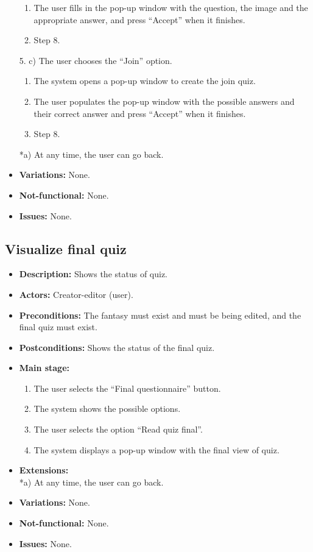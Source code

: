 \begin{itemize}
\begin{enumerate}
		\item The user fills in the pop-up window with the question, the image and the appropriate answer, and press ``Accept'' when it finishes.
		\item Step 8.
	\end{enumerate}
	5. c) The user chooses the ``Join'' option.
	\begin{enumerate}
		\item The system opens a pop-up window to create the join quiz.
		\item The user populates the pop-up window with the possible answers and their correct answer and press ``Accept'' when it finishes.
		\item Step 8.
	\end{enumerate}
	*a) At any time, the user can go back.
	\item \textbf{Variations:} None.
	\item \textbf{Not-functional:} None.
	\item \textbf{Issues:} None.
\end{itemize}

\subsection{Visualize final quiz}
\begin{itemize}
	\item \textbf{Description:} Shows the status of quiz.
	\item \textbf{Actors:} Creator-editor (user).
	\item \textbf{Preconditions:} The fantasy must exist and must be being edited, and the final quiz must exist.
	\item \textbf{Postconditions:} Shows the status of the final quiz.
	\item \textbf{Main stage:}
	\begin{enumerate}
		\item The user selects the ``Final questionnaire'' button.
		\item The system shows the possible options.
		\item The user selects the option ``Read quiz final''.
		\item The system displays a pop-up window with the final view of quiz.
	\end{enumerate}
	\item \textbf{Extensions:} \\ *a) At any time, the user can go back.
	\item \textbf{Variations:} None.
	\item \textbf{Not-functional:} None.
	\item \textbf{Issues:} None.
\end{itemize}


